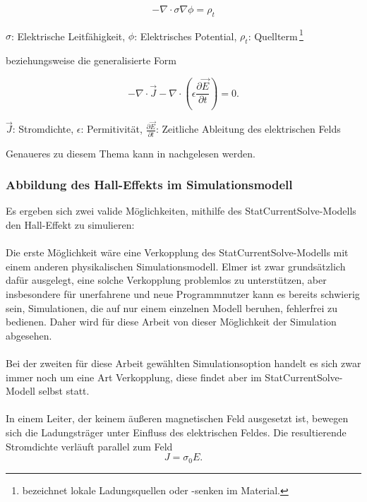 \documentclass[12pt, a4paper]{article}
\renewcommand{\footnotesize}{\fontsize{10pt}{12pt}\selectfont}
\begin{document}
\begin{equation}
	-\nabla\cdot\sigma\nabla\phi=\rho_t
	\tag{4.7}
	\label{4.7}
\end{equation}

\vspace{-0.8em}
\begin{center}
	\footnotesize
	$\sigma$: Elektrische Leitfähigkeit, $\phi$: Elektrisches Potential, $\rho_t$: Quellterm\,\footnote{bezeichnet lokale Ladungsquellen oder -senken im Material.}
\end{center}

{\raggedright
	beziehungsweise die generalisierte Form}

\begin{equation}
	-\nabla\cdot\vec{J}-\nabla\cdot(\epsilon\frac{\partial\vec{E}}{\partial{t}})=0.
	\tag{4.8}
	\label{4.8}
\end{equation}

\vspace{-0.8em}
\begin{center}
	\footnotesize
	$\vec{J}$: Stromdichte, $\epsilon$: Permitivität, $\frac{\partial\vec{E}}{\partial{t}}$: Zeitliche Ableitung des elektrischen Felds
\end{center}

{\raggedright
	Genaueres zu diesem Thema kann in \cite{elmerModel} nachgelesen werden.}

\subsubsection{Abbildung des Hall-Effekts im Simulationsmodell}
Es ergeben sich zwei valide Möglichkeiten, mithilfe des StatCurrentSolve-Modells den Hall-Effekt zu simulieren:\paragraph{}
Die erste Möglichkeit wäre eine Verkopplung des StatCurrentSolve-Modells mit einem anderen physikalischen Simulationsmodell. Elmer ist zwar grundsätzlich dafür ausgelegt, eine solche Verkopplung problemlos zu unterstützen, aber insbesondere für unerfahrene und neue Programmnutzer kann es bereits schwierig sein, Simulationen, die auf nur einem einzelnen Modell beruhen, fehlerfrei zu bedienen. Daher wird für diese Arbeit von dieser Möglichkeit der Simulation abgesehen.\paragraph{}
Bei der zweiten für diese Arbeit gewählten Simulationsoption handelt es sich zwar immer noch um eine Art Verkopplung, diese findet aber im StatCurrentSolve-Modell selbst statt.\paragraph{}
In einem Leiter, der keinem äußeren magnetischen Feld ausgesetzt ist, bewegen sich die Ladungsträger unter Einfluss des elektrischen Feldes. Die resultierende Stromdichte verläuft parallel zum Feld
\begin{equation}
	J=\sigma_0E.
	\tag{4.9}
	\label{4.9}
\end{equation}
\end{document}
